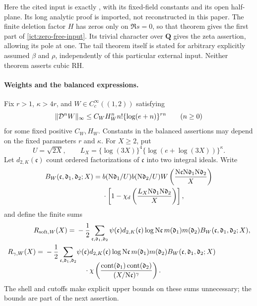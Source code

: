 Here the cited input is exactly \cite[Theorem~1.2, p.~3;
Theorem~8.29, pp.~78--80]{JCTLiu}, with its fixed-field constants
and its open half-plane. Its long analytic proof is imported,
not reconstructed in this paper. The finite deletion factor \(H\)
has zeros only on \(\Re s=0\), so that theorem gives the first
part of \eqref{jct:zero-free-input}. Its trivial character over
\(\mathbf Q\) gives the zeta assertion, allowing its pole at one.
The tail theorem itself is stated for arbitrary explicitly assumed
\(\beta\) and \(\rho\), independently of this
particular external input. Neither theorem asserts cubic RH.

\paragraph{Weights and the balanced expressions.}
Fix \(r>1\), \(\kappa>4r\), and
\(W\in C_c^\infty((1,2))\) satisfying
\begin{equation}
 \|\mathcal D^nW\|_\infty
 \le C_WH_W^n n!\{\log(e+n)\}^{rn}\qquad(n\ge0)
 \label{jct:weight}
\end{equation}
for some fixed positive \(C_W,H_W\).
Constants in the balanced assertions may depend on the fixed
parameters \(r\) and \(\kappa\).
For \(X\ge2\), put
\begin{equation}
 U=\sqrt{2X},\qquad
 L_X=\{\log(3X)\}^4\{\log(e+\log(3X))\}^{\kappa}.
 \label{jct:scales}
\end{equation}
Let \(d_{2,K}(\mathfrak c)\) count ordered factorizations of
\(\mathfrak c\) into two integral ideals.  Write
\begin{equation}
\begin{split}
 B_W(\mathfrak c,\mathfrak d_1,\mathfrak d_2;X)={}&
 b(\mathrm N\mathfrak d_1/U)b(\mathrm N\mathfrak d_2/U)
 W\left(\frac{\mathrm N\mathfrak c\mathrm N\mathfrak d_1\mathrm N\mathfrak d_2}X\right)\\
 &\cdot\left[1-\chi_d\left(
 \frac{L_X\mathrm N\mathfrak d_1\mathrm N\mathfrak d_2}X\right)\right],
 \label{jct:balanced-weight}
\end{split}
\end{equation}
and define the finite sums
\begin{align}
 R_{\mathrm{soft},W}(X)
 ={}&-\frac12\sum_{\mathfrak c,\mathfrak d_1,\mathfrak d_2}
 \psi(\mathfrak c)d_{2,K}(\mathfrak c)\log\mathrm N\mathfrak c\,
 m(\mathfrak d_1)m(\mathfrak d_2)
 B_W(\mathfrak c,\mathfrak d_1,\mathfrak d_2;X),
 \label{jct:rsoft}\\
 R_{\gamma,W}(X)
 ={}-\frac12\sum_{\mathfrak c,\mathfrak d_1,\mathfrak d_2}
 &\psi(\mathfrak c)d_{2,K}(\mathfrak c)\log\mathrm N\mathfrak c\,
 m(\mathfrak d_1)m(\mathfrak d_2)
 B_W(\mathfrak c,\mathfrak d_1,\mathfrak d_2;X)\notag\\[-2mm]
 &\hspace{4mm}\cdot\chi\left(
 \frac{\operatorname{cont}(\mathfrak d_1)\operatorname{cont}(\mathfrak d_2)}
 {(X/\mathrm N\mathfrak c)^\gamma}\right).
 \label{jct:rjoint}
\end{align}
The shell and cutoffs make explicit upper bounds on these sums
unnecessary; the bounds are part of the next assertion.

